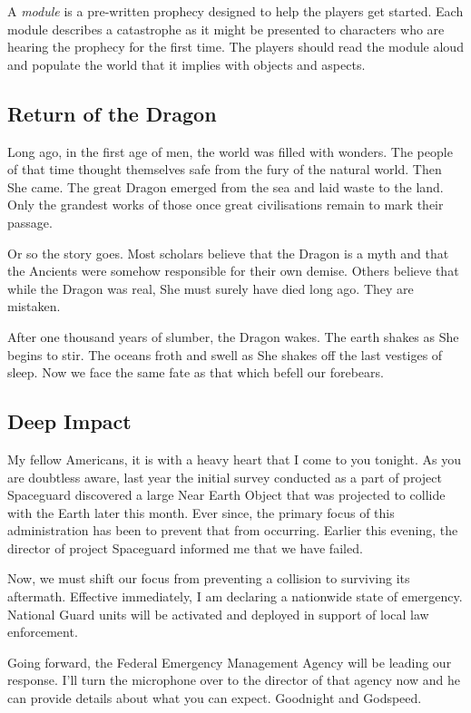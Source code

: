 \documentclass[12pt, a5paper, parskip=half-]{scrartcl}
\begin{document}
A \emph{module} is a pre-written prophecy designed  to help the players get started.
Each module describes a catastrophe as it might be presented to characters who are hearing the prophecy for the first time.  The players should read the module aloud and populate the world that it implies with objects and aspects.

\subsection*{Return of the Dragon}
Long ago, in the first age of men, the world was filled with wonders. 
The people of that time thought themselves safe from the fury of the natural world.
Then She came.
The great Dragon emerged from the sea and laid waste to the land.
Only the grandest works of those once great civilisations remain to mark their passage.

Or so the story goes.
Most scholars believe that the Dragon is a myth and that the Ancients were somehow responsible for their own demise.
Others believe that while the Dragon was real, She must surely have died long ago.
They are mistaken. 

After one thousand years of slumber, the Dragon wakes. 
The earth shakes as She begins to stir.
The oceans froth and swell as She shakes off the last vestiges of sleep.
Now we face the same fate as that which befell our forebears.

\newpage

\subsection*{Deep Impact}
My fellow Americans, it is with a heavy heart that I come to you tonight. 
As you are doubtless aware, last year the initial survey conducted as a part of project Spaceguard discovered a large Near Earth Object that was projected to collide with the Earth later this month.
Ever since, the primary focus of this administration has been to prevent that from occurring. Earlier this evening, the director of project Spaceguard informed me that we have failed.

Now, we must shift our focus from preventing a collision to surviving its aftermath.
Effective immediately, I am declaring a nationwide state of emergency. 
National Guard units will be activated and deployed in support of local law enforcement. 

Going forward, the Federal Emergency Management Agency will be leading our response.
I'll turn the microphone over to the director of that agency now and he can provide details about what you can expect.
Goodnight and Godspeed.
\end{document}
